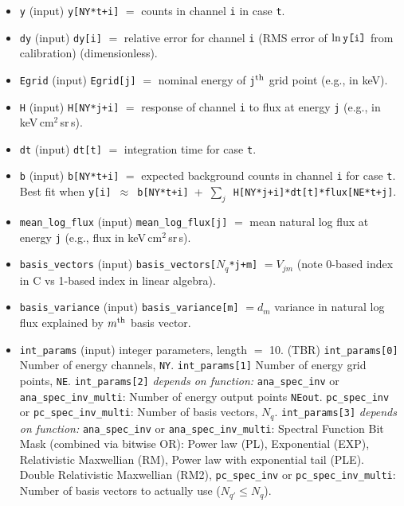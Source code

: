 \documentclass{article}    %
\begin{document}
\begin{itemize}
\item \verb|y| (input) \verb|y[NY*t+i]| $=$ counts in channel \verb|i| in case \verb|t|.
\item \verb|dy| (input) \verb|dy[i]| $=$ relative error for channel \verb|i| (RMS error of $\ln\verb|y[i]|$ from calibration)  (dimensionless).
\item \verb|Egrid| (input) \verb|Egrid[j]| $=$ nominal energy of \verb|j|$^{\rm th}$ grid point (e.g., in keV).
\item \verb|H| (input) \verb|H[NY*j+i]| $=$ response of channel \verb|i| to flux at energy \verb|j| (e.g., in keV\,cm$^2$\,sr\,s).
\item \verb|dt| (input) \verb|dt[t]| $=$ integration time for case \verb|t|.
\item \verb|b| (input) \verb|b[NY*t+i]| $=$ expected background counts in channel \verb|i| for case \verb|t|. Best fit when \verb|y[i]|~$\approx$~\verb|b[NY*t+i]|~+~$\sum_j$~\verb|H[NY*j+i]*dt[t]*flux[NE*t+j]|.
\item \verb|mean_log_flux| (input) \verb|mean_log_flux[j]| $=$ mean natural log flux at energy \verb|j| (e.g., flux in keV\,cm$^2$\,sr\,s).
\item \verb|basis_vectors| (input) \verb|basis_vectors[|$N_q$\verb|*j+m]| $=V_{jm}$ (note 0-based index in C vs 1-based index in linear algebra).
\item \verb|basis_variance| (input) \verb|basis_variance[m]| $=d_m$ variance in natural log flux explained by $m^{\rm th}$ basis vector.
\item \verb|int_params| (input) integer parameters, length $=$ 10. (TBR)
\subitem \verb|int_params[0]| Number of energy channels, \verb|NY|.
\subitem \verb|int_params[1]| Number of energy grid points, \verb|NE|.
\subitem \verb|int_params[2]| {\it depends on function:}
\subsubitem \verb|ana_spec_inv| or \verb|ana_spec_inv_multi|: Number of energy output points \verb|NEout|.
\subsubitem \verb|pc_spec_inv| or \verb|pc_spec_inv_multi|: Number of basis vectors, $N_q$.
\subitem \verb|int_params[3]| {\it depends on function:}
\subsubitem \verb|ana_spec_inv| or \verb|ana_spec_inv_multi|: Spectral Function Bit Mask (combined via bitwise OR):
\subsubitem[1] Power law (PL),
\subsubitem[2] Exponential (EXP),
\subsubitem[4] Relativistic Maxwellian (RM),
\subsubitem[8] Power law with exponential tail (PLE).
\subsubitem[16] Double Relativistic Maxwellian (RM2),
\subsubitem \verb|pc_spec_inv| or \verb|pc_spec_inv_multi|: Number of basis vectors to actually use ($N_{q'} \le N_q$).

\end{itemize}
\end{document}
